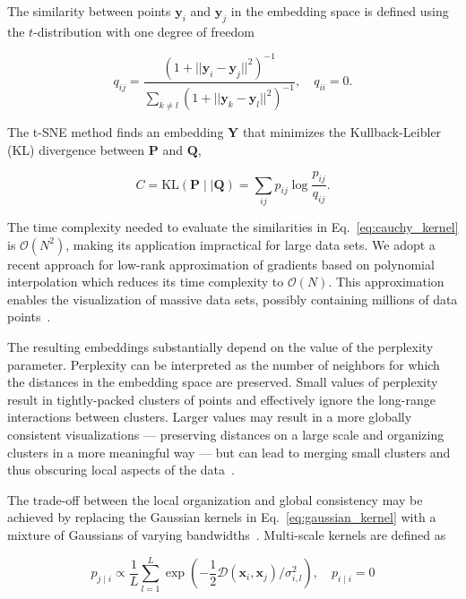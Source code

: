 \documentclass[runningheads]{llncs}
\begin{document}
The similarity between points $\mathbf{y}_i$ and $\mathbf{y}_j$ in the
embedding space is defined using the $t$-distribution with one degree of
freedom

\begin{equation}
q_{ij} = \frac{\left ( 1 + || \mathbf{y}_i - \mathbf{y}_j ||^2 \right )^{-1}}
{\sum_{k \neq l}\left ( 1 + || \mathbf{y}_k - \mathbf{y}_l ||^2 \right )^{-1}},
\quad q_{ii} = 0.
\label{eq:cauchy_kernel}
\end{equation}

The t-SNE method finds an embedding $\mathbf{Y}$ that minimizes the
Kullback-Leibler (KL) divergence between $\mathbf{P}$ and $\mathbf{Q}$,

\begin{equation}
C = \text{KL}(\mathbf{P} \mid \mid \mathbf{Q}) = \sum_{ij} p_{ij} \log \frac{p_{ij}}{q_{ij}}.
\label{eq:kl_divergence}
\end{equation}

The time complexity needed to evaluate the similarities in
Eq.~\ref{eq:cauchy_kernel} is $\mathcal{O}(N^2)$, making its application
impractical for large data sets. We adopt a recent approach for low-rank
approximation of gradients based on polynomial interpolation which reduces its
time complexity to $\mathcal{O}(N)$. This approximation enables the
visualization of massive data sets, possibly containing millions of data
points~\cite{Linderman2019}.

The resulting embeddings substantially depend on the value of the perplexity
parameter. Perplexity can be interpreted as the number of neighbors for which
the distances in the embedding space are preserved. Small values of perplexity
result in tightly-packed clusters of points and effectively ignore the
long-range interactions between clusters. Larger values may result in a more
globally consistent visualizations --- preserving distances on a large scale and
organizing clusters in a more meaningful way --- but can lead to merging small
clusters and thus obscuring local aspects of the data~\cite{Kobak2019}.

The trade-off between the local organization and global consistency may be
achieved by replacing the Gaussian kernels in Eq.~\ref{eq:gaussian_kernel} with
a mixture of Gaussians of varying bandwidths~\cite{Lee2015}. Multi-scale kernels
are defined as

\begin{equation}
p_{j \mid i} \propto \frac{1}{L} \sum_{l=1}^{L} \exp \left ( - \frac{1}{2} \mathcal{D}(\mathbf{x}_i, \mathbf{x}_j ) / \sigma_{i,l}^2 \right ), \quad p_{i \mid i} = 0
\label{eq:multiscale}
\end{equation}
\end{document}
